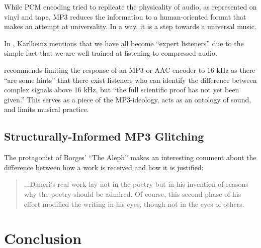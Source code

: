 \documentclass{thesis}
\begin{document}
While PCM encoding tried to replicate the physicality of audio, as represented on vinyl and tape, MP3 reduces the information to a human-oriented format that makes an attempt at universality. In a way, it is a step towards a universal music.

In \cite[9]{karlheinz_brandenburg_mp3_1999}, Karlheinz mentions that we have all become ``expert listeners'' due to the simple fact that we are well trained at listening to compressed audio.

\cite[10]{karlheinz_brandenburg_mp3_1999} recommends limiting the response of an MP3 or AAC encoder to 16 kHz as there ``are some hints'' that there exist listeners who can identify the difference between complex signals above 16 kHz, but ``the full scientific proof has not yet been given.'' This serves as a piece of the MP3-ideology, acts as an ontology of sound, and limits musical practice.
	
\section{Structurally-Informed MP3 Glitching}

	The protagonist of Borges' ``The Aleph'' makes an interesting comment about the difference between how a work is received and how it is justified:
	
	\begin{quote}
	...Daneri's real work lay not in the poetry but in his invention of reasons why the poetry should be admired. Of course, this second phase of his effort modified the writing in his eyes, though not in the eyes of others.
	\end{quote}
	
\chapter{Conclusion}

\begin{singlespace}


\end{singlespace}
\end{document}
